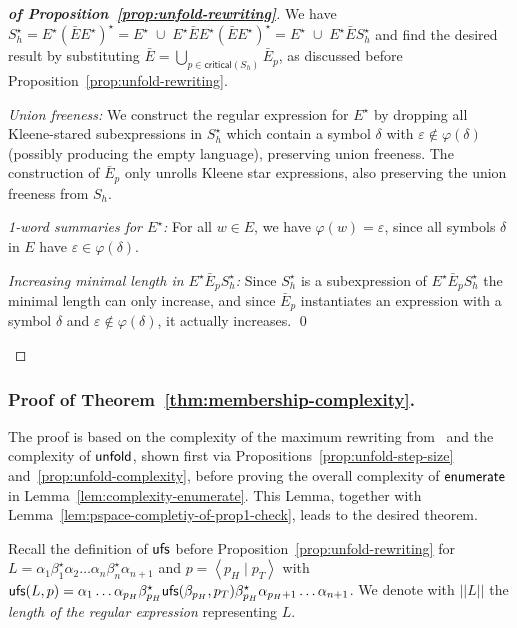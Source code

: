 \documentclass[envcountsame]{llncs}
\newcommand{\setenumeration}{\ensuremath{{\sf enumerate}}\xspace}
\newcommand{\unfold}{\ensuremath{{\sf unfold}}\xspace}
\newcommand{\unfoldstep}{\ensuremath{{\sf ufs}}\xspace}
\newcommand{\criticalpos}{\ensuremath{\mathsf{critical}}\xspace}
\begin{document}
\begin{proof}[\textbf{of Proposition~\ref{prop:unfold-rewriting}}]
  We have $S_h^\star=E^\star(\bar E E^\star)^\star=E^\star\; \cup \;
  E^\star\bar E E^\star(\bar E E^\star)^\star=E^\star\; \cup \;
  E^\star\bar E S_h^\star$
and find the desired result by substituting $\bar E= \bigcup_{p\in
    \criticalpos(S_h)} \bar E_p$, as discussed before
  Proposition~\ref{prop:unfold-rewriting}.

  \begin{inparaenum}[\bfseries(1)]
  \item \emph{Union freeness:} We construct the regular expression for
    $E^\star$ by dropping all Kleene-stared subexpressions in
    $S_h^\star$ which contain a symbol $\delta$ with
    $\varepsilon\not\in\varphi(\delta)$ (possibly producing the empty
    language), preserving union freeness.
The construction of $\bar E_p$ only unrolls Kleene star expressions,
    also preserving the union freeness  from $S_h$. 
  \item \emph{1-word summaries for $E^\star$:} For all $w\in E$, we
    have $\varphi(w)=\varepsilon$, since all symbols $\delta$ in $E$
    have $\varepsilon\in\varphi(\delta)$.
  \item \emph{Increasing minimal length in $E^\star\bar E_p
      S_h^\star$:} Since $S_h^\star$ is a subexpression of
    $E^\star\bar E_p S_h^\star$ the minimal length can only increase,
    and since $\bar E_p$ instantiates an expression with a symbol
    $\delta$ and $\varepsilon\not\in\varphi(\delta)$, it actually
    increases. \qed
  \end{inparaenum}
\end{proof}



\subsubsection{Proof of Theorem~\ref{thm:membership-complexity}.}
The proof is based on the complexity of the maximum rewriting
from~\cite{rewriting} and the complexity of \unfold, shown first via
Propositions~\ref{prop:unfold-step-size}
and~\ref{prop:unfold-complexity}, before proving the overall
complexity of \setenumeration in Lemma~\ref{lem:complexity-enumerate}.
This Lemma, together with
Lemma~\ref{lem:pspace-completiy-of-prop1-check}, leads to the desired
theorem. 


Recall the definition of \unfoldstep before
Proposition~\ref{prop:unfold-rewriting} for
$L=\alpha_1\beta_1^\star\alpha_2 \dots
\alpha_n\beta_n^\star\alpha_{n+1}$ and $p=\left<p_H\mid p_T\right>$
with $\unfoldstep(L, p) = \alpha_1\dots \alpha_{p_H} \beta_{p_H}^\star
\unfoldstep(\beta_{p_H},p_T) \beta_{p_H}^\star
\alpha_{p_H+1}\dots\alpha_{n+1}$.
We denote with $||L||$ the \emph{length of the regular expression}
representing $L$.
\end{document}
